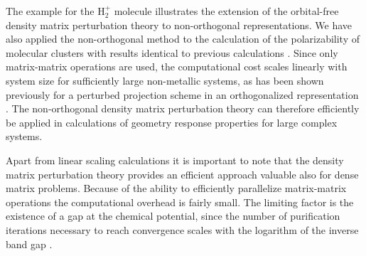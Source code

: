 \documentclass[twocolumn,showpacs,preprintnumbers,amsmath,amssymb]{revtex4}
\begin{document}
The example for the H$_2^+$ molecule illustrates the extension of the orbital-free density matrix
perturbation theory to non-orthogonal representations. We have also applied the non-orthogonal
method to the calculation of the polarizability of molecular clusters with results
identical to previous calculations \cite{WeberPRT2}. Since 
only matrix-matrix operations are used, the computational cost 
scales linearly with system size for sufficiently large non-metallic systems, 
as has been shown previously for a perturbed projection scheme in an orthogonalized representation 
\cite{WeberPRT2}.  The non-orthogonal density matrix perturbation theory can therefore efficiently 
be applied in calculations of geometry response properties for large complex systems. 

Apart from linear scaling calculations it is important to note that the density
matrix perturbation theory provides an efficient approach valuable also for dense 
matrix problems. Because of the ability to efficiently parallelize matrix-matrix
operations the computational overhead is fairly small. The limiting factor is 
the existence of a gap at the chemical potential,
since the number of purification iterations necessary to reach convergence scales with the logarithm 
of the inverse band gap \cite{NiklassonTC2}.

\end{document}
